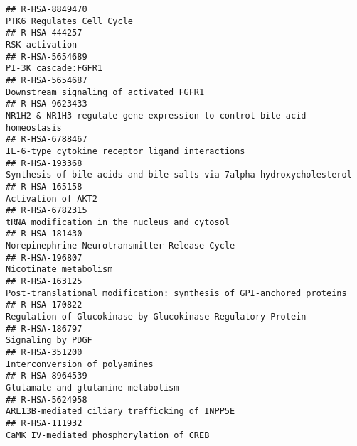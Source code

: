 \documentclass[
]{article}
\begin{document}
\begin{verbatim}
## R-HSA-8849470                                                                                                            PTK6 Regulates Cell Cycle
## R-HSA-444257                                                                                                                        RSK activation
## R-HSA-5654689                                                                                                                  PI-3K cascade:FGFR1
## R-HSA-5654687                                                                                              Downstream signaling of activated FGFR1
## R-HSA-9623433                                                              NR1H2 & NR1H3 regulate gene expression to control bile acid homeostasis
## R-HSA-6788467                                                                                      IL-6-type cytokine receptor ligand interactions
## R-HSA-193368                                                                  Synthesis of bile acids and bile salts via 7alpha-hydroxycholesterol
## R-HSA-165158                                                                                                                    Activation of AKT2
## R-HSA-6782315                                                                                         tRNA modification in the nucleus and cytosol
## R-HSA-181430                                                                                         Norepinephrine Neurotransmitter Release Cycle
## R-HSA-196807                                                                                                                 Nicotinate metabolism
## R-HSA-163125                                                                   Post-translational modification: synthesis of GPI-anchored proteins
## R-HSA-170822                                                                           Regulation of Glucokinase by Glucokinase Regulatory Protein
## R-HSA-186797                                                                                                                     Signaling by PDGF
## R-HSA-351200                                                                                                         Interconversion of polyamines
## R-HSA-8964539                                                                                                   Glutamate and glutamine metabolism
## R-HSA-5624958                                                                                        ARL13B-mediated ciliary trafficking of INPP5E
## R-HSA-111932                                                                                              CaMK IV-mediated phosphorylation of CREB

\end{verbatim}
\end{document}
